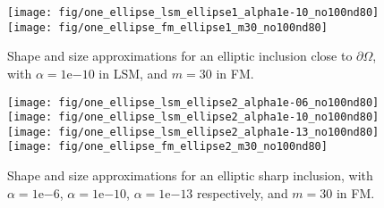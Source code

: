 \begin{center}
\begin{figure}
{
\texttt{[image: fig/one\_ellipse\_lsm\_ellipse1\_alpha1e-10\_no100nd80]}
}
{
\texttt{[image: fig/one\_ellipse\_fm\_ellipse1\_m30\_no100nd80]}
}
\caption{Shape and size approximations for an elliptic inclusion close to $\partial\Omega$, with $\alpha=\mathrm{1e}{-10}$ in LSM, 
and $m=30$ in FM.}
\label{fig:one_ellipse1}
\end{figure}
\end{center}




\begin{center}

\begin{figure}
{
\texttt{[image: fig/one\_ellipse\_lsm\_ellipse2\_alpha1e-06\_no100nd80]}
}
{
\texttt{[image: fig/one\_ellipse\_lsm\_ellipse2\_alpha1e-10\_no100nd80]}
}
\\
{
\texttt{[image: fig/one\_ellipse\_lsm\_ellipse2\_alpha1e-13\_no100nd80]}
}
{
\texttt{[image: fig/one\_ellipse\_fm\_ellipse2\_m30\_no100nd80]}
}
\caption{Shape and size approximations for an elliptic sharp inclusion, with $\alpha=\mathrm{1e}{-6}$, 
$\alpha=\mathrm{1e}{-10}$, $\alpha=\mathrm{1e}{-13}$ respectively, and $m=30$ in FM.}
\label{fig:one_ellipse2}
\end{figure}

\end{center}



